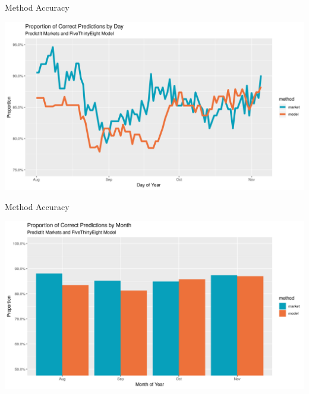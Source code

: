 \documentclass[
  ignorenonframetext,
]{beamer}
\begin{document}
\begin{frame}{Method Accuracy}
\protect\hypertarget{method-accuracy}{}

\includegraphics{../plots/plot_prop_day.png}

\end{frame}

\begin{frame}{Method Accuracy}
\protect\hypertarget{method-accuracy-1}{}

\includegraphics{../plots/plot_prop_month.png}

\end{frame}
\end{document}
